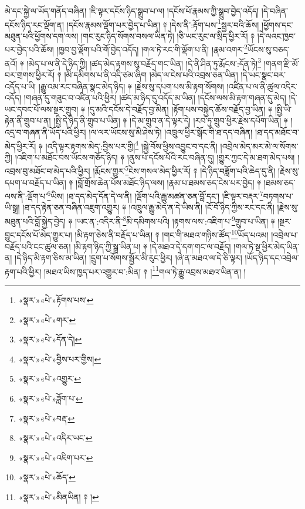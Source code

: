 མེ་དང་སྐྱེ་ལ་ཡོད་གནོད་བཞིན། །ཇི་ལྟར་དངོས་ཉིད་སྒྲུབ་པ་ལ། །དངོས་པོ་རྣམས་ཀྱི་སྒྲུབ་བྱེད་འདོད། །དེ་བཞིན་དངོས་ཉིད་རང་ལྡོག་ན། །དངོས་རྣམས་ལྡོག་པར་བྱེད་པ་ཡིན། ༈ །དེས་ནི་:རྟོག་པས་\footnote{«སྣར་»«པེ་»རྟོགས་པས་}སྦྱར་བའི་ཆོས། །ཕྱོགས་དང་མཐུན་པའི་ཕྱོགས་དག་ལས། །གང་རུང་ཉིད་སོགས་བསལ་ཡིན་ཏེ། །ཅི་ཡང་རུང་ལ་སྲིད་ཕྱིར་རོ། ༈ །དེ་ལའང་ཁྱབ་པར་བྱེད་པའི་ཆོས། །ཁྱབ་བྱ་ལྡོག་པའི་གོ་བྱེད་འདོད། །གལ་ཏེ་རང་གི་ལྡོག་པ་ནི། །རྣམ་འགར་\footnote{«སྣར་»«པེ་»གར་}ཡོངས་སུ་བཅད་ནའོ། ༈ །མེད་པ་ལ་ནི་དེ་ཉིད་ཀྱི། །ཚད་མེད་རྟགས་སུ་བརྗོད་གང་ཡིན། །དེ་ནི་ཤིན་ཏུ་རྨོངས་:དོན་ཏེ།\footnote{«སྣར་»«པེ་»དོན་དེ།} །གནག་རྫི་མོ་བར་གྲགས་ཕྱིར་རོ། ༈ །མི་དམིགས་པ་ནི་འདི་ཙམ་ཞིག །མེད་ལ་ངེས་པའི་འབྲས་ཅན་ཡིན། །དེ་ཡང་སྣང་བར་འདོད་པ་ཡི། །རྒྱུ་འམ་རང་བཞིན་སྣང་མེད་ཉིད། ༈ །རྗེས་སུ་དཔག་པས་མི་རྟག་སོགས། །འཛིན་པ་ལ་ནི་ཚུལ་འདིར་འདོད། །གཞན་དུ་གཟུང་བ་འཛིན་པའི་ཕྱིར། །ཚད་མ་ཉིད་དུ་འདོད་མ་ཡིན། །དངོས་ལས་མི་རྟག་གཞན་དུ་མེད། །དེ་ཡང་དབང་པོ་ལས་སྔར་གྲུབ། ༈ །དུ་མའི་དངོས་དེ་བརྗོད་བྱ་མིན། །རྟོག་པས་བསྐྱེད་ཆོས་བརྗོད་བྱ་ཡིན། ༈ །སྤྱི་ཡི་རྟེན་ནི་གྲུབ་པ་ན། །སྤྱི་དེ་ཉིད་ནི་གྲུབ་པ་ཡིན། ༈ །དེ་མ་གྲུབ་ན་དེ་ལྟར་དེ། །རབ་ཏུ་གྲུབ་ཕྱིར་རྗེས་དཔོག་ཡིན། ༈ །འདྲ་བ་གཞན་ནི་ཡོད་པའི་ཕྱིར། །ལ་ལར་ཡོངས་སུ་མི་ཤེས་ཏེ། །འཁྲུལ་ཕྱིར་སྒོང་གི་ཐ་དད་བཞིན། །ཐ་དད་མཐོང་བ་མེད་ཕྱིར་རོ། ༈ །འདི་ལྟར་རྟགས་མེད་:བྱིས་པར་གྱི།\footnote{«སྣར་»«པེ་»བྱིས་པར་གྱིས།} །སྐྱེ་བོས་ཕྱིས་འབྱུང་བ་དང་ནི། །འབྲེལ་མེད་མར་མེ་ལ་སོགས་ཀྱི། །འཇིག་པ་མཐོང་བས་ཡོངས་གཅོད་ཉིད། ༈ །ནུས་པ་དངོས་པོའི་རང་བཞིན་དུ། །གྱུར་ཀྱང་དེ་མ་ཐག་མེད་པས། །འབྲས་བུ་མཐོང་བ་མེད་པའི་ཕྱིར། །རྨོངས་གྱུར་\footnote{«སྣར་»«པེ་»འགྱུར་}ངེས་གསལ་མེད་ཕྱིར་རོ། ༈ །དེ་ཉིད་བཟློག་པའི་ཆེད་དུ་ནི། །རྗེས་སུ་དཔག་པ་བརྗོད་པ་ཡིན། ༈ །བློ་གྲོས་ཆེན་པོས་མཐོང་ཉིད་ལས། །རྣམ་པ་ཐམས་ཅད་ངེས་པར་བྱེད། ༈ །ཐམས་ཅད་ལས་ནི་:ལྡོག་པ་\footnote{«སྣར་»«པེ་»ཟློག་པ་}ཡིས། །ཐ་དད་མེད་དོན་དེ་ལ་ནི། །ལྡོག་པའི་རྒྱུ་མཚན་ཅན་བློ་དང་། །ཇི་ལྟར་བརྡར་\footnote{«སྣར་»«པེ་»བརྡ་}བཏགས་པ་ཡི་སྒྲ། །ཐ་དད་རྟེན་ཅན་བཞིན་འཇུག་འགྱུར། ༈ །འཁྲུལ་རྒྱུ་མེད་ན་དེ་ཡིས་ནི། །ངོ་བོ་ཉིད་ཀྱིས་རང་དང་ནི། །རྗེས་སུ་མཐུན་པའི་བློ་སྐྱེད་བྱེད། ༈ །ཡང་ན་:འདིར་ནི་\footnote{«སྣར་»«པེ་»འདིར་ཡང་}མི་དམིགས་པའི། །རྟགས་ལས་:འཇིག་པ་\footnote{«སྣར་»«པེ་»འཇིག་པར་}གྲུབ་པ་ཡིན། ༈ །སྔར་བྱུང་དངོས་པོ་མེད་གྱུར་པ། །མི་རྟག་ཅེས་ནི་བརྗོད་པ་ཡིན། ༈ །གང་གི་མཐའ་གཉིས་ཚོད་\footnote{«སྣར་»«པེ་»ཆོད་}ཡོད་པའམ། །འབྲེལ་པ་བརྗོད་པའི་ངང་ཚུལ་ཅན། །མི་རྟག་ཉིད་ཀྱི་སྒྲ་ཡིན་པ། ༈ །དེ་མཐའ་དེ་དག་གང་ལ་བརྗོད། །གལ་ཏེ་སྔ་ཕྱིར་མེད་ཡིན་ན། །དེ་ཉིད་མི་རྟག་ཅིས་མ་ཡིན། །དྲུག་པ་སོགས་སྦྱོར་མི་རུང་ཕྱིར། །ཞེ་ན་མཐའ་ལ་དེ་ཅི་ལྟར། །ཡོད་ཉིད་དང་འབྲེལ་རྟག་པའི་ཕྱིར། །མཐའ་ཡིས་ཁྱད་པར་འགྱུར་བ་:མིན། ༈ །\footnote{«སྣར་»«པེ་»མིནཡིན། ༈ །}གལ་ཏེ་རྒྱུ་འབྲས་མཐའ་ཡིན་ན། །
